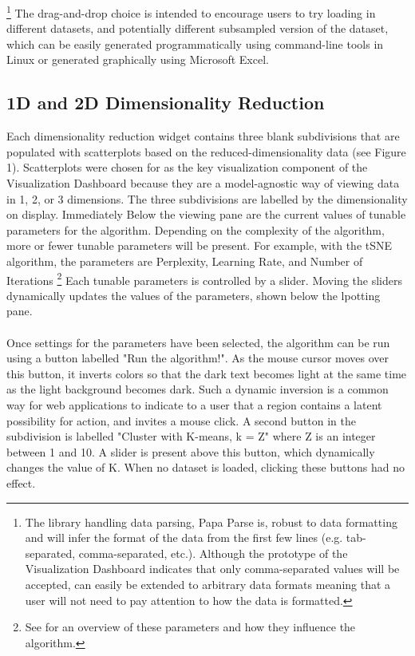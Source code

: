 \documentclass{sigchi}
\begin{document}
%
\footnote{The library handling data parsing, Papa Parse \cite{papaparse} is, robust to data formatting and will infer the format of the data from the first few lines (e.g. tab-separated, comma-separated, etc.). %
%
Although the prototype of the Visualization Dashboard indicates that only comma-separated values will be accepted, \cite{papaparse} can easily be extended to arbitrary data formats meaning that a user will not need to pay attention to how the data is formatted.}%
%
The drag-and-drop choice is intended to encourage users to try loading in different datasets, and potentially different subsampled version of the dataset, which can be easily generated programmatically using command-line tools in Linux or generated graphically using Microsoft Excel.%
%
\subsection{1D and 2D Dimensionality Reduction}
%
Each dimensionality reduction widget contains three blank subdivisions that are populated with scatterplots based on the reduced-dimensionality data (see Figure 1). %
%
Scatterplots were chosen for as the key visualization component of the Visualization Dashboard because they are a model-agnostic way of viewing data in 1, 2, or 3 dimensions. %
%
The three subdivisions are labelled by the dimensionality on display. %
%
Immediately Below the viewing pane are the current values of tunable parameters for the algorithm. %
%
Depending on the complexity of the algorithm, more or fewer tunable parameters will be present. %
%
For example, with the tSNE algorithm, the parameters are Perplexity, Learning Rate, and Number of Iterations%
%
\footnote{See \cite{wattenberg2016how} for an overview of these parameters and how they influence the algorithm.} %
%
Each tunable parameters is controlled by a slider. %
%
Moving the sliders dynamically updates the values of the parameters, shown below the lpotting pane. %
\\\\
%
Once settings for the parameters have been selected, the algorithm can be run using a button labelled "Run the algorithm!". %
%
As the mouse cursor moves over this button, it inverts colors so that the dark text becomes light at the same time as the light background becomes dark. %
%
Such a dynamic inversion is a common way for web applications to indicate to a user that a region contains a latent possibility for action, and invites a mouse click. %
%
A second button in the subdivision is labelled "Cluster with K-means, k = Z" where Z is an integer between 1 and 10. %
%
A slider is present above this button, which dynamically changes the value of K. %
%
When no dataset is loaded, clicking these buttons had no effect.
%
\end{document}
